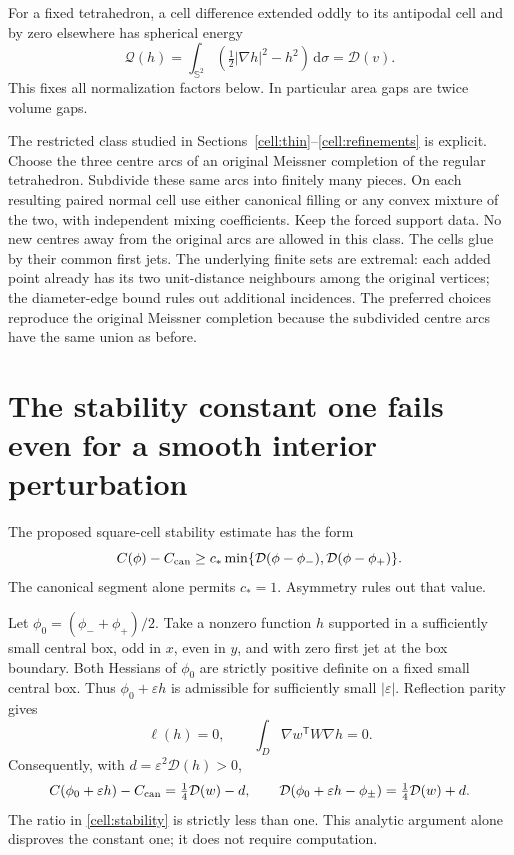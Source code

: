 \documentclass[11pt]{article}
\theoremstyle{remark}\newtheorem{remark}[theorem]{Remark}
\newcommand{\Sph}{\mathbb S^2}
\newcommand{\dd}{\,\mathrm d}
\newcommand{\Q}{\mathcal Q}
\newcommand{\Dir}{\mathcal D}
\begin{document}
For a fixed tetrahedron, a cell difference extended oddly to its antipodal cell and by zero elsewhere has spherical energy
\[
 \Q(h)=\int_{\Sph}(\tfrac12|\nabla h|^2-h^2)\dd\sigma=\Dir(v).
\]
This fixes all normalization factors below. In particular area gaps are twice volume gaps.

The restricted class studied in Sections~\ref{cell:thin}--\ref{cell:refinements} is explicit. Choose the three centre arcs of an original Meissner completion of the regular tetrahedron. Subdivide these same arcs into finitely many pieces. On each resulting paired normal cell use either canonical filling or any convex mixture of the two, with independent mixing coefficients. Keep the forced support data. No new centres away from the original arcs are allowed in this class. The cells glue by their common first jets. The underlying finite sets are extremal: each added point already has its two unit-distance neighbours among the original vertices; the diameter-edge bound rules out additional incidences. The preferred choices reproduce the original Meissner completion because the subdivided centre arcs have the same union as before.

\section{The stability constant one fails even for a smooth interior perturbation}
The proposed square-cell stability estimate has the form
\begin{equation}\label{cell:stability}
 C(\phi)-C_{\rm can}\geq c_*
 \min\{\Dir(\phi-\phi_-),\Dir(\phi-\phi_+)\}.
\end{equation}
The canonical segment alone permits $c_*=1$. Asymmetry rules out that value.

Let $\phi_0=(\phi_-+\phi_+)/2$. Take a nonzero function $h$ supported in a sufficiently small central box, odd in $x$, even in $y$, and with zero first jet at the box boundary. Both Hessians of $\phi_0$ are strictly positive definite on a fixed small central box. Thus $\phi_0+\varepsilon h$ is admissible for sufficiently small $|\varepsilon|$. Reflection parity gives
\[
 \ell(h)=0,\qquad \int_D\nabla w^{\mathsf T}W\nabla h=0.
\]
Consequently, with $d=\varepsilon^2\Dir(h)>0$,
\begin{equation}\label{cell:ratio}
 C(\phi_0+\varepsilon h)-C_{\rm can}=\tfrac14\Dir(w)-d,
 \qquad
 \Dir(\phi_0+\varepsilon h-\phi_\pm)=\tfrac14\Dir(w)+d.
\end{equation}
The ratio in \eqref{cell:stability} is strictly less than one. This analytic argument alone disproves the constant one; it does not require computation.
\end{document}
